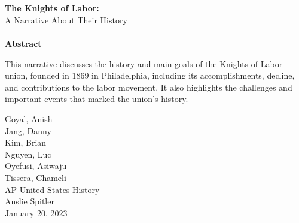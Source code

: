 \begin{titlepage}
\begin{center}




~\\[2.5cm]

\HRule \\[0.4cm]
{ \Large \bfseries The Knights of Labor:}\\
{   A Narrative About Their History}\\[0.4cm]

\HRule \\[0.5cm]





\textbf{Abstract} \\

\begin{flushleft}
\begin{spacing}{1.0}

{\small
This narrative discusses the history and main goals of the Knights of Labor union, founded in 1869 in Philadelphia, including its accomplishments, decline, and contributions to the labor movement. It also highlights the challenges and important events that marked the union's history. }\\

\end{spacing}
\end{flushleft}

\vfill

\begin{flushright}
\small {Goyal, Anish \\
Jang, Danny \\
Kim, Brian \\
Nguyen, Luc \\
Oyefusi, Asiwaju \\
Tissera, Chameli \\}
\large AP United States History \\
\large Anslie Spitler\\
{\large January 20, 2023}
\end{flushright}


\end{center}
\end{titlepage}